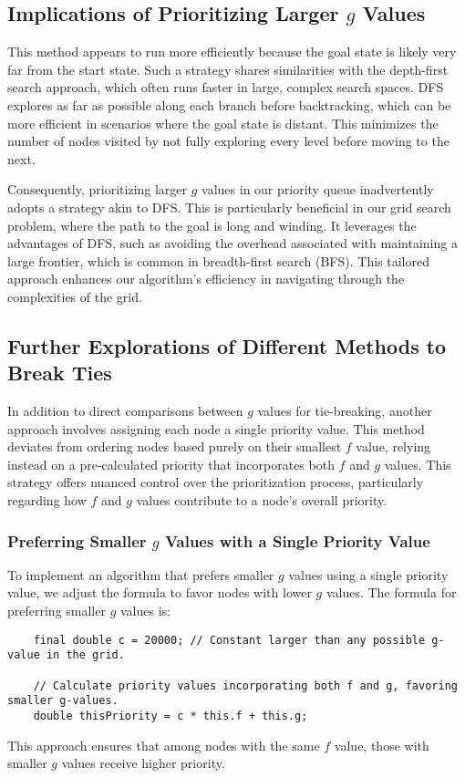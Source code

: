 \documentclass{article}
\begin{document}
\subsection{Implications of Prioritizing Larger $g$ Values}
This method appears to run more efficiently because the goal state is likely very far from the start state. Such a strategy shares similarities with the depth-first search approach, which often runs faster in large, complex search spaces. DFS explores as far as possible along each branch before backtracking, which can be more efficient in scenarios where the goal state is distant. This minimizes the number of nodes visited by not fully exploring every level before moving to the next.

Consequently, prioritizing larger $g$ values in our priority queue inadvertently adopts a strategy akin to DFS. This is particularly beneficial in our grid search problem, where the path to the goal is long and winding. It leverages the advantages of DFS, such as avoiding the overhead associated with maintaining a large frontier, which is common in breadth-first search (BFS). This tailored approach enhances our algorithm's efficiency in navigating through the complexities of the grid.

\subsection{Further Explorations of Different Methods to Break Ties}
In addition to direct comparisons between \(g\) values for tie-breaking, another approach involves assigning each node a single priority value. This method deviates from ordering nodes based purely on their smallest \(f\) value, relying instead on a pre-calculated priority that incorporates both \(f\) and \(g\) values. This strategy offers nuanced control over the prioritization process, particularly regarding how \(f\) and \(g\) values contribute to a node's overall priority.

\subsubsection{Preferring Smaller \(g\) Values with a Single Priority Value}
To implement an algorithm that prefers smaller \(g\) values using a single priority value, we adjust the formula to favor nodes with lower \(g\) values. The formula for preferring smaller \(g\) values is:
\begin{verbatim}
    final double c = 20000; // Constant larger than any possible g-value in the grid.
    
    // Calculate priority values incorporating both f and g, favoring smaller g-values.
    double thisPriority = c * this.f + this.g;
\end{verbatim}
This approach ensures that among nodes with the same \(f\) value, those with smaller \(g\) values receive higher priority.
\end{document}
